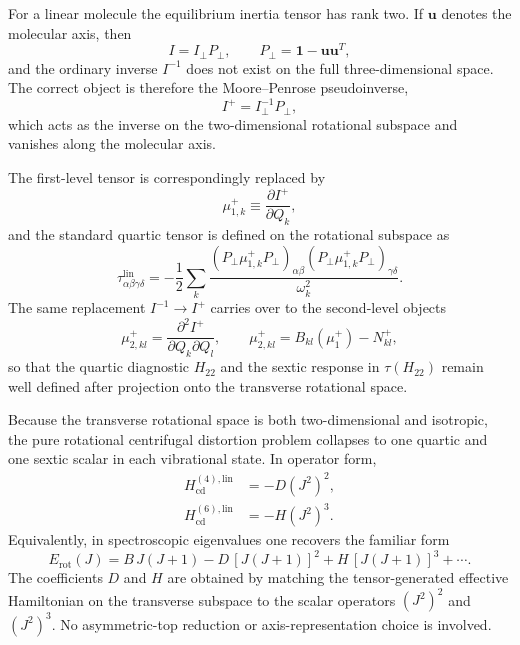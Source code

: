 \documentclass[journal=jacsat,manuscript=article]{achemso}
\begin{document}
For a linear molecule the equilibrium inertia tensor has rank two. If
$\mathbf u$ denotes the molecular axis, then
\begin{equation}
I = I_{\perp} P_{\perp},
\qquad
P_{\perp} = \mathbf 1 - \mathbf u\mathbf u^T,
\end{equation}
and the ordinary inverse $I^{-1}$ does not exist on the full
three-dimensional space. The correct object is therefore the Moore--Penrose
pseudoinverse,
\begin{equation}
I^+ = I_{\perp}^{-1} P_{\perp},
\end{equation}
which acts as the inverse on the two-dimensional rotational subspace and
vanishes along the molecular axis.

The first-level tensor is correspondingly replaced by
\begin{equation}
\mu_{1,k}^{+} \equiv \frac{\partial I^+}{\partial Q_k},
\end{equation}
and the standard quartic tensor is defined on the rotational subspace as
\begin{equation}
\tau_{\alpha\beta\gamma\delta}^{\mathrm{lin}}
=
-\frac12
\sum_k
\frac{
\left(P_{\perp}\mu_{1,k}^{+}P_{\perp}\right)_{\alpha\beta}
\left(P_{\perp}\mu_{1,k}^{+}P_{\perp}\right)_{\gamma\delta}
}{\omega_k^2}.
\label{eq:app_linear_tau}
\end{equation}
The same replacement $I^{-1}\to I^+$ carries over to the second-level objects
\begin{equation}
\mu_{2,kl}^{+}
=
\frac{\partial^2 I^+}{\partial Q_k\partial Q_l},
\qquad
\mu_{2,kl}^{+} = B_{kl}(\mu_1^{+}) - N_{kl}^{+},
\end{equation}
so that the quartic diagnostic $H_{22}$ and the sextic response in
$\tau(H_{22})$ remain well defined after projection onto the transverse
rotational space.

Because the transverse rotational space is both two-dimensional and isotropic,
the pure rotational centrifugal distortion problem collapses to one quartic and
one sextic scalar in each vibrational state. In operator form,
\begin{align}
H_{\mathrm{cd}}^{(4),\mathrm{lin}} &= -D \left(J^2\right)^2, \\
H_{\mathrm{cd}}^{(6),\mathrm{lin}} &= -H \left(J^2\right)^3.
\end{align}
Equivalently, in spectroscopic eigenvalues one recovers the familiar form
\begin{equation}
E_{\mathrm{rot}}(J)
=
B\,J(J+1)
-D\,[J(J+1)]^2
+H\,[J(J+1)]^3+\cdots .
\end{equation}
The coefficients $D$ and $H$ are obtained by matching the tensor-generated
effective Hamiltonian on the transverse subspace to the scalar operators
$(J^2)^2$ and $(J^2)^3$. No asymmetric-top reduction or axis-representation
choice is involved.
\end{document}
